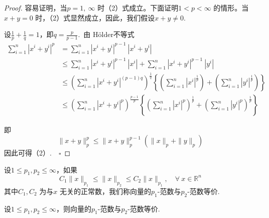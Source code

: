 \documentclass{article}
\begin{document}
\vspace{20pt}

\begin{proof}
    容易证明，当\(p = 1,\ \infty \) 时（2）式成立。下面证明\(1 < p < \infty \) 的情形。当\(x + y = 0\) 时，（2）式显然成立，因此，我们假设\(x + y \neq 0\).

\vspace{10pt}

\noindent 设\(\frac{1}{p} + \frac{1}{q} = 1\)，即\(q = \frac{p}{p - 1} \).\ 由 H\"older不等式
\begin{align*}
    \sum_{i=1}^n | x^i + y^i |^p &= \sum_{i=1}^n | x^i + y^i |^{p - 1}\ | x^i + y^i | \\
    & \le \sum_{i=1}^n | x^i + y^i |^{p - 1}\ | x^i |+\sum_{i=1}^n | x^i + y^i |^{p - 1}\ | y^i | \\
    & \le \left( \sum_{i=1}^n | x^i + y^i |^{(p - 1)q} \right)^\frac{1}{q} \left\{\left(\sum_{i=1}^n | x^i |^\frac{1}{p}\right) + \left( \sum_{i=1}^n | y^i |^\frac{1}{p}   \right) \right\} \\
    & \le \left( \sum_{i=1}^n | x^i + y^i |^p  \right)^\frac{p - 1}{p}\left\{\left( \sum_{i=1}^n | x^i |^p  \right)^\frac{1}{p} + \left( \sum_{i=1}^n | y^i |^p  \right)^\frac{1}{p} \right\}
\end{align*}

即
\begin{equation*}
    \|x + y\|_p^p \le \|x + y\|_p^{p - 1}(\|x\|_p+\|y\|_p)
\end{equation*}
因此可得（2）.\(\quad \square\)
\end{proof}

\newpage

设\(1 \le p_1, p_2 \le \infty \)，如果
\begin{equation*}
    C_1\|x\|_{p_1} \le \|x\|_{p_2} \le C_2\|x\|_{p_1},\quad \forall \ x \in \mathbb{R}^n
\end{equation*}
其中\(C_1,C_2\) 为与\(x\) 无关的正常数，我们称向量的\(p_1\)-范数与\(p_2\)-范数等价.

\vspace{20pt}

\begin{proposition}{}{}
设\(1 \le p_1, p_2 \le \infty \)，则向量的\(p_1\)-范数与\(p_2\)-范数等价.
\end{proposition}

\vspace{20pt}
\end{document}
